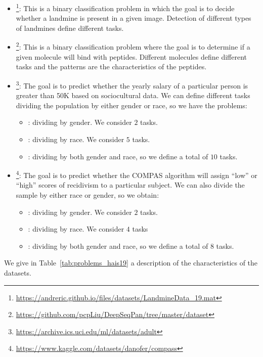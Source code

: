 \begin{itemize}
    \item {}\footnote{\url{https://andreric.github.io/files/datasets/LandmineData\_19.mat}}: This is a binary classification problem in which the goal is to decide whether a landmine is present in a given image. Detection of different types of landmines define different tasks. 
    \item {}\footnote{\url{https://github.com/pcpLiu/DeepSeqPan/tree/master/dataset}}: This is a binary classification problem where the goal is to determine if a given molecule will bind with peptides. Different molecules define different tasks and the patterns are the characteristics of the peptides.
    \item {}\footnote{\url{https://archive.ics.uci.edu/ml/datasets/adult}}: The goal is to predict whether the yearly salary of a particular person is greater than \num{50}K based on sociocultural data. We can define different tasks dividing the population by either gender or race, so we have the problems:
    \begin{itemize}
        \item {}: dividing by gender. We consider $2$ tasks.
        \item {}: dividing by race. We consider $5$ tasks.
        \item {}: dividing by both gender and race, so we define a total of $10$ tasks.
    \end{itemize}
    \item {}\footnote{\url{https://www.kaggle.com/datasets/danofer/compass}}: The goal is to predict whether the COMPAS algorithm will assign ``low'' or ``high'' scores of recidivism to a particular subject. We can also divide the sample by either race or gender, so we obtain:
    \begin{itemize}
        \item {}: dividing by gender. We consider $2$ tasks.
        \item {}: dividing by race. We consider $4$ tasks
        \item {}: dividing by both gender and race, so we define a total of $8$ tasks.
    \end{itemize}
\end{itemize}
We give in Table~\ref{tab:problems_hais19} a description of the characteristics of the datasets.


